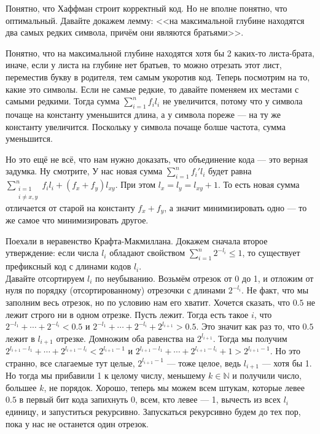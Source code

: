 \documentclass{article}
\begin{document}
\begin{itemize}
\begin{Proof}
            Понятно, что Хаффман строит корректный код. Но не вполне понятно, что оптимальный. Давайте докажем лемму: <<на максимальной глубине находятся два самых редких символа, причём они являются братьями>>.
            \begin{Proof}
                Понятно, что на максимальной глубине находятся хотя бы 2 каких-то листа-брата, иначе, если у листа на глубине нет братьев, то можно отрезать этот лист, переместив букву в родителя, тем самым укоротив код.
                Теперь посмотрим на то, какие это символы. Если не самые редкие, то давайте поменяем их местами с самыми редкими. Тогда сумма $\sum_{i=1}^nf_il_i$ не увеличится, потому что у символа почаще на константу уменьшится длина, а у символа пореже --- на ту же константу увеличится. Поскольку у символа почаще болше частота, сумма уменьшится.
            \end{Proof}
            Но это ещё не всё, что нам нужно доказать, что объединение кода --- это верная задумка. Ну смотрите, У нас новая сумма $\sum_{i=1}^nf_i'l_i$ будет равна $\sum_{\substack{i=1\\i\neq x,y}}^nf_il_i+(f_x+f_y)l_{xy}$. При этом $l_x=l_y=l_{xy}+1$. То есть новая сумма отличается от старой на константу $f_x+f_y$, а значит минимизировать одно --- то же самое что минимизировать другое.
        \end{Proof}
        \pagebreak
        \begin{Proof}
            Поехали в неравенство Крафта-Макмиллана. Докажем сначала второе утверждение: если числа $l_i$ обладают свойством $\sum_{i=1}^n2^{-l_i}\leqslant1$, то существует префиксный код с длинами кодов $l_i$.\\
            Давайте отсортируем $l_i$ по неубыванию. Возьмём отрезок от 0 до 1, и отложим от нуля по порядку (отсортированному) отрезочки с длинами $2^{-l_i}$. Не факт, что мы заполним весь отрезок, но по условию нам его хватит. Хочется сказать, что $0.5$ не лежит строго ни в одном отрезке. Пусть лежит. Тогда есть такое $i$, что $2^{-l_1}+\cdots+2^{-l_i}<0.5$ и $2^{-l_1}+\cdots+2^{-l_i}+2^{l_{i+1}}>0.5$. Это значит как раз то, что $0.5$ лежит в $l_{i+1}$ отрезке. Домножим оба равенства на $2^{l_{i+1}}$. Тогда мы получим $2^{l_{i+1}-l_1}+\cdots+2^{l_{i+1}-l_i}<2^{l_{i+1}-1}$ и $2^{l_{i+1}-l_1}+\cdots+2^{l_{i+1}-l_i}+1>2^{l_{i+1}-1}$. Но это странно, все слагаемые тут целые, $2^{l_{i+1}-1}$ --- тоже целое, ведь $l_{i+1}$ --- хотя бы 1. Но тогда мы прибавили 1 к целому числу, меньшему $k\in\mathbb N$ и получили число, большее $k$, не порядок. Хорошо, теперь мы можем всем штукам, которые левее $0.5$ в первый бит кода запихнуть 0, всем, кто левее --- 1, вычесть из всех $l_i$ единицу, и запуститься рекурсивно. Запускаться рекурсивно будем до тех пор, пока у нас не останется один отрезок.\\

\end{Proof}
\end{itemize}
\end{document}
